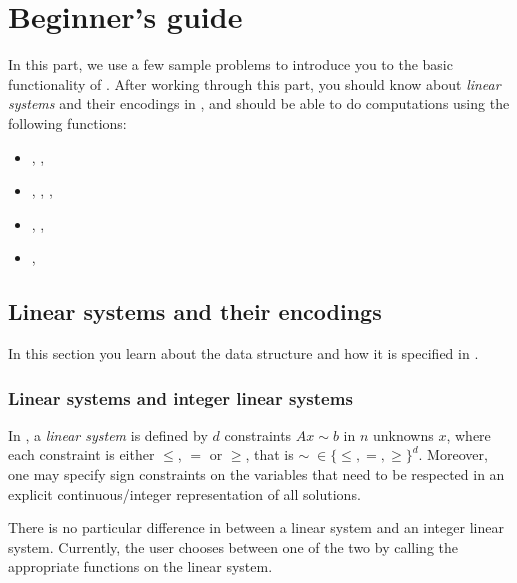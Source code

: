 %
%
%

\chapter{Beginner's guide}
\label{Chapter: Beginner's guide}

In this part, we use a few sample problems to introduce you to the
basic functionality of \FourTiTwo{}. After working through this
part, you should know about \emph{linear systems} and their
encodings in \FourTiTwo{}, and should be able to do computations
using the following functions:
\begin{itemize}
\item {}, , 
\item {}, , , 
\item {}, , 
\item {}, 
\end{itemize}



\section{Linear systems and their encodings}

In this section you learn about the data structure  and how it is specified in \FourTiTwo.

\subsection{Linear systems and integer linear systems}

In \FourTiTwo, a \emph{linear system} is defined by $d$ constraints
$Ax\sim b$ in $n$ unknowns $x$, where each constraint is either
$\leq$, $=$ or $\geq$, that is $\sim\;\in\{\leq,=,\geq\}^d$.
Moreover, one may specify sign constraints on the variables that
need to be respected in an explicit continuous/integer
representation of all solutions.

There is no particular difference in \FourTiTwo{} between a linear
system and an integer linear system. Currently, the user chooses
between one of the two by calling the appropriate functions on the
linear system.



